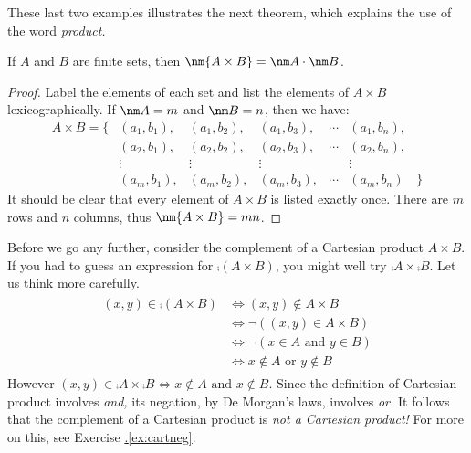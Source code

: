\noindent These last two examples illustrates the next theorem, which explains the use of the word \emph{product.}

\begin{thm}
If $A$ and $B$ are finite sets, then $\nm{A\times B}=\nm A\cdot\nm B$.
\end{thm}

\begin{proof}
Label the elements of each set and list the elements of $A\times B$ lexicographically. If $\nm A=m$ and $\nm B=n$, then we have:
\[\begin{array}{rccccccl}
A\times B=\big\{&(a_1,b_1),&(a_1,b_2),&(a_1,b_3),&\cdots&(a_1,b_n),&\\
&(a_2,b_1),&(a_2,b_2),&(a_2,b_3),&\cdots&(a_2,b_n),&\\
&\vdots&\vdots&\vdots&&\vdots&\\
&(a_m,b_1),&(a_m,b_2),&(a_m,b_3),&\cdots&(a_m,b_n)&\big\}
\end{array}\]
It should be clear that every element of $A\times B$ is listed exactly once. There are $m$ rows and $n$ columns, thus $\nm{A\times B}=mn$.
\end{proof}

Before we go any further, consider the complement of a Cartesian product $A\times B$. If you had to guess an expression for $\comp{(A\times B)}$, you might well try $\comp A\times\comp B$. Let us think more carefully.
\begin{gather*}
\begin{aligned}
(x,y)\in\comp{(A\times B)}&\iff (x,y)\not\in A\times B\\
&\iff \neg((x,y)\in A\times B)\\
&\iff \neg(x\in A\text{ and }y\in B)\\
&\iff x\not\in A\text{ or }y\not\in B
\end{aligned}
\end{gather*}
However $(x,y)\in\comp A\times\comp B\iff x\not\in A\text{ and }x\not\in B$. Since the definition of Cartesian product involves \emph{and,} its negation, by De Morgan's laws, involves \emph{or.} It follows that the complement of a Cartesian product is \emph{not a Cartesian product!} For more on this, see Exercise \hyperref[ex:cartneg]{\thesubsection.\ref*{ex:cartneg}}.\\


